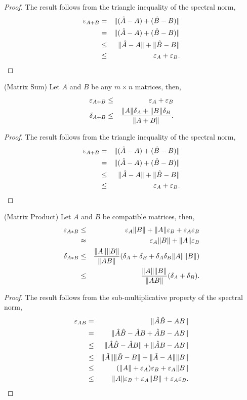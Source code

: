 \begin{proof}
  The result follows from the triangle inequality of the spectral norm,
  \begin{eqnarray}
    \varepsilon_{ A+B } 
      &=& \| (\hat{A} - A) + (\hat{B} - B) \| \\
      &=& \| (\hat{A} - A) + (\hat{B} - B) \| \\
      &\le& \| \hat{A} - A \| + \| \hat{B} - B \| \\
      &\le& \varepsilon_{A} + \varepsilon_{B}.
  \end{eqnarray}
\end{proof}

\begin{proposition}(Matrix Sum)
  Let $A$ and $B$ be any $m \times n$ matrices, then, 
  \begin{eqnarray}
    \varepsilon_{A+B} &\le& \varepsilon_{A} + \varepsilon_{B} \\
    \delta_{A+B} &\le& \frac{\|A\|\delta_{A} + \|B\|\delta_{B}}{\|A+B\|}.
  \end{eqnarray}
\end{proposition}
\begin{proof}
  The result follows from the triangle inequality of the spectral norm,
  \begin{eqnarray}
    \varepsilon_{ A+B } 
      &=& \| (\hat{A} - A) + (\hat{B} - B) \| \\
      &=& \| (\hat{A} - A) + (\hat{B} - B) \| \\
      &\le& \| \hat{A} - A \| + \| \hat{B} - B \| \\
      &\le& \varepsilon_{A} + \varepsilon_{B}.
  \end{eqnarray}
\end{proof}

\begin{proposition}(Matrix Product)
  Let $A$ and $B$ be compatible matrices, then, 
  \begin{eqnarray}
    \varepsilon_{A*B} &\le& \varepsilon_{A} \|B\| + \|A\| \varepsilon_{B} + \varepsilon_{A} \varepsilon_{B} \\
               &\approx& \varepsilon_{A} \|B\| + \|A\| \varepsilon_{B} \\
   \delta_{A*B} &\le& \frac{\|A\|\|B\|}{\|AB\|} (\delta_{A} + \delta_{B} + \delta_{A}\delta_{B} \|A\|\|B\|) \\
              &\le& \frac{\|A\|\|B\|}{\|AB\|} (\delta_{A} + \delta_{B}).
  \end{eqnarray}
\end{proposition}
\begin{proof}
  The result follows from the sub-multiplicative property of the
  spectral norm,
  \begin{eqnarray}
    \varepsilon_{ A B } 
      &=& \| \hat{A} \hat{B} - A B \| \\
      &=& \| \hat{A} \hat{B} - \hat{A} B + \hat{A} B - A B \| \\
      &\le& \| \hat{A} \hat{B} - \hat{A} B \|  + \| \hat{A} B - A B \| \\
      &\le& \| \hat{A} \| \| \hat{B} - B \|  + \| \hat{A} - A \| \| B \| \\
      &\le& (\|A\| + \varepsilon_{A}) \varepsilon_{B} + \varepsilon_{A} \| B \| \\
      &\le& \|A\| \varepsilon_{B} + \varepsilon_{A} \|B\| + \varepsilon_{A} \varepsilon_{B}.
  \end{eqnarray}
\end{proof}

